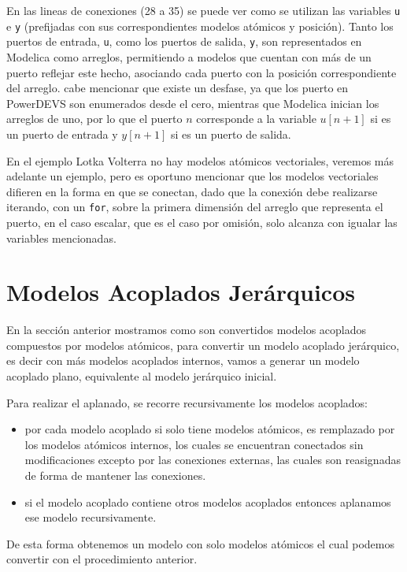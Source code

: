 	En las lineas de conexiones (28 a 35) se puede ver como se utilizan las variables \texttt{u} e \texttt{y} (prefijadas con sus correspondientes modelos
	atómicos y posición). Tanto los puertos de entrada, \texttt{u}, como los puertos de salida, \texttt{y}, son representados en Modelica como arreglos,
	permitiendo a modelos que cuentan con más de un puerto reflejar este hecho, asociando cada puerto con la posición correspondiente del arreglo. 
	cabe mencionar que existe un desfase, ya que los puerto en PowerDEVS son enumerados desde el cero, mientras que Modelica inician los arreglos de uno, por lo
	que el puerto $n$ corresponde a la variable $u[n+1]$ si es un puerto de entrada y $y[n+1]$ si es un puerto de salida.

	En el ejemplo Lotka Volterra no hay modelos atómicos vectoriales, veremos más adelante un ejemplo, pero es oportuno mencionar que los modelos
	vectoriales difieren en la forma en que se conectan, dado que la conexión debe realizarse iterando, con un \texttt{for}, sobre la primera dimensión del 
	arreglo que representa el puerto, en el caso escalar, que es el caso por omisión, solo alcanza con igualar las variables mencionadas.


\section{Modelos Acoplados Jerárquicos}
En la sección anterior mostramos como son convertidos modelos acoplados compuestos por modelos atómicos, para convertir un modelo acoplado jerárquico, es decir con más modelos acoplados internos, vamos a generar un modelo acoplado plano, equivalente al modelo jerárquico inicial.

Para realizar el aplanado, se recorre recursivamente los modelos acoplados:

\begin{itemize}
\item por cada modelo acoplado si solo tiene modelos atómicos, es remplazado por los modelos atómicos internos, los cuales se encuentran conectados sin modificaciones excepto por las conexiones externas, las cuales son reasignadas de forma de mantener las conexiones.
\item si el modelo acoplado contiene otros modelos acoplados entonces aplanamos ese modelo recursivamente.
\end{itemize} 

De esta forma obtenemos un modelo con solo modelos atómicos el cual podemos convertir con el procedimiento anterior.

